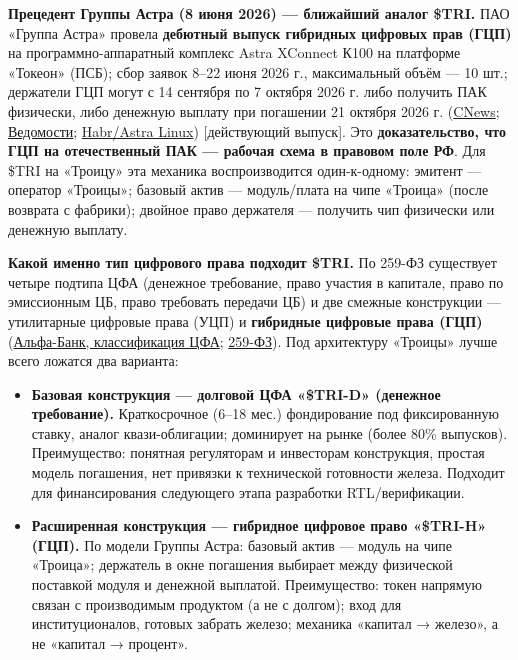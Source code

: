 \documentclass[
  russian,
]{article}
\providecommand{\tightlist}{%
  \setlength{\itemsep}{0pt}\setlength{\parskip}{0pt}}
\begin{document}
\textbf{Прецедент Группы Астра (8 июня 2026) --- ближайший аналог
\$TRI.} ПАО «Группа Астра» провела \textbf{дебютный выпуск гибридных
цифровых прав (ГЦП)} на программно-аппаратный комплекс Astra XConnect
К100 на платформе «Токеон» (ПСБ); сбор заявок 8--22 июня 2026 г.,
максимальный объём --- 10 шт.; держатели ГЦП могут с 14 сентября по 7
октября 2026 г. либо получить ПАК физически, либо денежную выплату при
погашении 21 октября 2026 г.
(\href{https://www.cnews.ru/news/line/2026-06-05_gruppa_astra_obyavlyaet}{CNews};
\href{https://www.vedomosti.ru/investments/articles/2026/06/04/1202800-gruppa-astra-debyutiruet-na-rinke-gibridnih-tsifrovih-prav}{Ведомости};
\href{https://habr.com/ru/companies/astralinux/articles/1043876/}{Habr/Astra
Linux}) {[}действующий выпуск{]}. Это \textbf{доказательство, что ГЦП на
отечественный ПАК --- рабочая схема в правовом поле РФ}. Для \$TRI на
«Троицу» эта механика воспроизводится один-к-одному: эмитент ---
оператор «Троицы»; базовый актив --- модуль/плата на чипе «Троица»
(после возврата с фабрики); двойное право держателя --- получить чип
физически или денежную выплату.

\textbf{Какой именно тип цифрового права подходит \$TRI.} По 259-ФЗ
существует четыре подтипа ЦФА (денежное требование, право участия в
капитале, право по эмиссионным ЦБ, право требовать передачи ЦБ) и две
смежные конструкции --- утилитарные цифровые права (УЦП) и
\textbf{гибридные цифровые права (ГЦП)}
(\href{https://alfabank.ru/alfa-investor/posts/t/36b3a704-3866-f111-91c6-0050569e1fd0/}{Альфа-Банк,
классификация ЦФА};
\href{https://toveks.ru/\%F0\%9F\%94\%B4-normativnye-trebovaniya-i-regulyatornye-riski-blokchejn-proektov/}{259-ФЗ}).
Под архитектуру «Троицы» лучше всего ложатся два варианта:

\begin{itemize}
\tightlist
\item
  \textbf{Базовая конструкция --- долговой ЦФА «\$TRI-D» (денежное
  требование).} Краткосрочное (6--18 мес.) фондирование под
  фиксированную ставку, аналог квази-облигации; доминирует на рынке
  (более 80\% выпусков). Преимущество: понятная регуляторам и инвесторам
  конструкция, простая модель погашения, нет привязки к технической
  готовности железа. Подходит для финансирования следующего этапа
  разработки RTL/верификации.
\item
  \textbf{Расширенная конструкция --- гибридное цифровое право «\$TRI-H»
  (ГЦП).} По модели Группы Астра: базовый актив --- модуль на чипе
  «Троица»; держатель в окне погашения выбирает между физической
  поставкой модуля и денежной выплатой. Преимущество: токен напрямую
  связан с производимым продуктом (а не с долгом); вход для
  институционалов, готовых забрать железо; механика «капитал → железо»,
  а не «капитал → процент».
\end{itemize}
\end{document}

